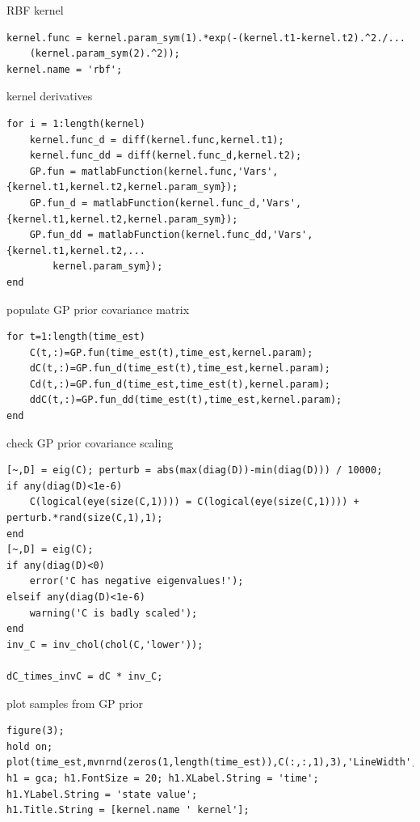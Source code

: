 RBF kernel
\color{RoyalPurple}\begin{verbatim}
kernel.func = kernel.param_sym(1).*exp(-(kernel.t1-kernel.t2).^2./...
    (kernel.param_sym(2).^2));
kernel.name = 'rbf';
\end{verbatim}
\color{black}
\begin{par}
kernel derivatives
\end{par} \vspace{1em}
\color{RoyalPurple}\begin{verbatim}
for i = 1:length(kernel)
    kernel.func_d = diff(kernel.func,kernel.t1);
    kernel.func_dd = diff(kernel.func_d,kernel.t2);
    GP.fun = matlabFunction(kernel.func,'Vars',{kernel.t1,kernel.t2,kernel.param_sym});
    GP.fun_d = matlabFunction(kernel.func_d,'Vars',{kernel.t1,kernel.t2,kernel.param_sym});
    GP.fun_dd = matlabFunction(kernel.func_dd,'Vars',{kernel.t1,kernel.t2,...
        kernel.param_sym});
end
\end{verbatim}
\color{black}
\begin{par}
populate GP prior covariance matrix
\end{par} \vspace{1em}
\color{RoyalPurple}\begin{verbatim}
for t=1:length(time_est)
    C(t,:)=GP.fun(time_est(t),time_est,kernel.param);
    dC(t,:)=GP.fun_d(time_est(t),time_est,kernel.param);
    Cd(t,:)=GP.fun_d(time_est,time_est(t),kernel.param);
    ddC(t,:)=GP.fun_dd(time_est(t),time_est,kernel.param);
end
\end{verbatim}
\color{black}
\begin{par}
check GP prior covariance scaling
\end{par} \vspace{1em}
\color{RoyalPurple}\begin{verbatim}
[~,D] = eig(C); perturb = abs(max(diag(D))-min(diag(D))) / 10000;
if any(diag(D)<1e-6)
    C(logical(eye(size(C,1)))) = C(logical(eye(size(C,1)))) + perturb.*rand(size(C,1),1);
end
[~,D] = eig(C);
if any(diag(D)<0)
    error('C has negative eigenvalues!');
elseif any(diag(D)<1e-6)
    warning('C is badly scaled');
end
inv_C = inv_chol(chol(C,'lower'));

dC_times_invC = dC * inv_C;
\end{verbatim}
\color{black}
\begin{par}
plot samples from GP prior
\end{par} \vspace{1em}
\color{RoyalPurple}\begin{verbatim}
figure(3);
hold on; plot(time_est,mvnrnd(zeros(1,length(time_est)),C(:,:,1),3),'LineWidth',2);
h1 = gca; h1.FontSize = 20; h1.XLabel.String = 'time'; h1.YLabel.String = 'state value';
h1.Title.String = [kernel.name ' kernel'];
\end{verbatim}
\color{black}


